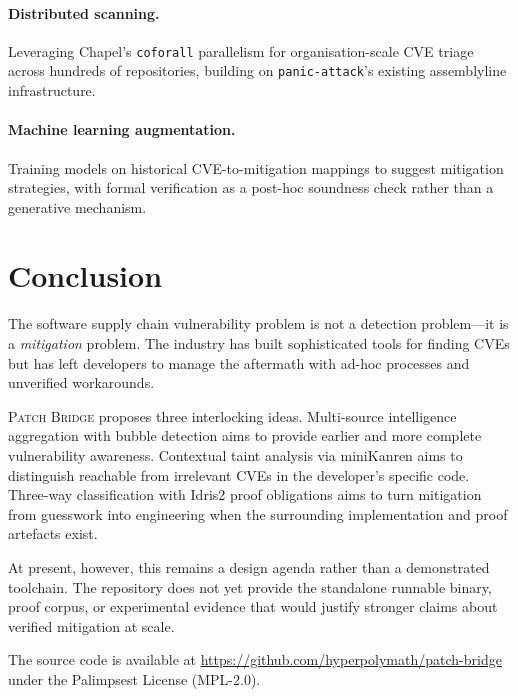 \documentclass[11pt,twocolumn]{article}
\begin{document}
\paragraph{Distributed scanning.} Leveraging Chapel's \texttt{coforall}
parallelism for organisation-scale CVE triage across hundreds of
repositories, building on \texttt{panic-attack}'s existing assemblyline
infrastructure.

\paragraph{Machine learning augmentation.} Training models on
historical CVE-to-mitigation mappings to suggest mitigation strategies,
with formal verification as a post-hoc soundness check rather than a
generative mechanism.

\section{Conclusion}
\label{sec:conclusion}

The software supply chain vulnerability problem is not a detection
problem---it is a \emph{mitigation} problem. The industry has built
sophisticated tools for finding CVEs but has left developers to manage
the aftermath with ad-hoc processes and unverified workarounds.

\textsc{Patch Bridge} proposes three interlocking ideas. Multi-source
intelligence aggregation with bubble detection aims to provide earlier
and more complete vulnerability awareness. Contextual taint analysis
via miniKanren aims to distinguish reachable from irrelevant CVEs in the
developer's specific code. Three-way classification with Idris2 proof
obligations aims to turn mitigation from guesswork into engineering when
the surrounding implementation and proof artefacts exist.

At present, however, this remains a design agenda rather than a
demonstrated toolchain. The repository does not yet provide the
standalone runnable binary, proof corpus, or experimental evidence that
would justify stronger claims about verified mitigation at scale.

The source code is available at
\url{https://github.com/hyperpolymath/patch-bridge} under the
Palimpsest License (MPL-2.0).

\end{document}
